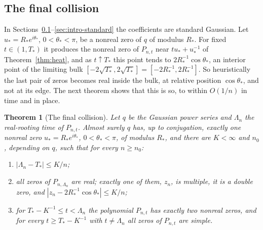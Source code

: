 \documentclass[11pt]{amsart}
\newtheorem{theorem}{Theorem}[section]
\theoremstyle{definition}
\theoremstyle{remark}
\numberwithin{equation}{section}
\begin{document}
\subsection{The final collision}\label{sec:intro-collision}
In Sections~\ref{sec:intro-collision}--\ref{sec:intro-standard} the coefficients are standard Gaussian. Let $u_*=R_*e^{i\theta_*}$, $0<\theta_*<\pi$, be a nonreal zero of $q$ of modulus $R_*$. For fixed $t\in(1,T_*)$ it produces the nonreal zero of $P_{n,t}$ near $tu_*+u_*^{-1}$ of Theorem~\ref{thm:heat}, and as $t\uparrow T_*$ this point tends to $2R_*^{-1}\cos\theta_*$, an interior point of the limiting bulk $[-2\sqrt{T_*},2\sqrt{T_*}]=[-2R_*^{-1},2R_*^{-1}]$. So heuristically the last pair of zeros becomes real inside the bulk, at relative position $\cos\theta_*$, and not at its edge. The next theorem shows that this is so, to within $O(1/n)$ in time and in place.

\begin{theorem}[The final collision]\label{thm:collision-intro}
Let $q$ be the Gaussian power series and $\Lambda_n$ the real-rooting time of $P_{n,t}$. Almost surely $q$ has, up to conjugation, exactly one nonreal zero $u_*=R_*e^{i\theta_*}$, $0<\theta_*<\pi$, of modulus $R_*$, and there are $K<\infty$ and $n_0$, depending on $q$, such that for every $n\ge n_0$:
\begin{enumerate}
\item[(a)] $|\Lambda_n-T_*|\le K/n$;
\item[(b)] all zeros of $P_{n,\Lambda_n}$ are real; exactly one of them, $z_n$, is multiple, it is a double zero, and $|z_n-2R_*^{-1}\cos\theta_*|\le K/n$;
\item[(c)] for $T_*-K^{-1}\le t<\Lambda_n$ the polynomial $P_{n,t}$ has exactly two nonreal zeros, and for every $t\ge T_*-K^{-1}$ with $t\ne\Lambda_n$ all zeros of $P_{n,t}$ are simple.
\end{enumerate}
\end{theorem}
\end{document}
